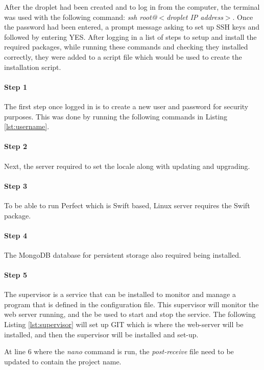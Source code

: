 After the droplet had been created and to log in from the computer, the terminal was used with the following command: \textit{ssh root@$<$droplet IP address$>$}. Once the password had been entered, a prompt message asking to set up SSH keys and followed by entering YES. After logging in a list of steps to setup and install the required packages, while running these commands and checking they installed correctly, they were added to a script file which would be used to create the installation script.

\paragraph{Step 1}
The first step once logged in is to create a new user and password for security purposes. This was done by running the following commands in Listing \ref{lst:username}.



\paragraph{Step 2}
Next, the server required to set the locale along with updating and upgrading.


\paragraph{Step 3}
To be able to run Perfect which is Swift based, Linux server requires the Swift package.


\paragraph{Step 4}
The MongoDB database for persistent storage also required being installed.


\paragraph{Step 5}
The supervisor is a service that can be installed to monitor and manage a program that is defined in the configuration file. This supervisor will monitor the web server running, and the be used to start and stop the service. The following Listing \ref{lst:supervisor} will set up GIT which is where the web-server will be installed, and then the supervisor will be installed and set-up.

At line 6 where the \textit{nano} command is run, the \textit{post-receive} file need to be updated to contain the project name.


